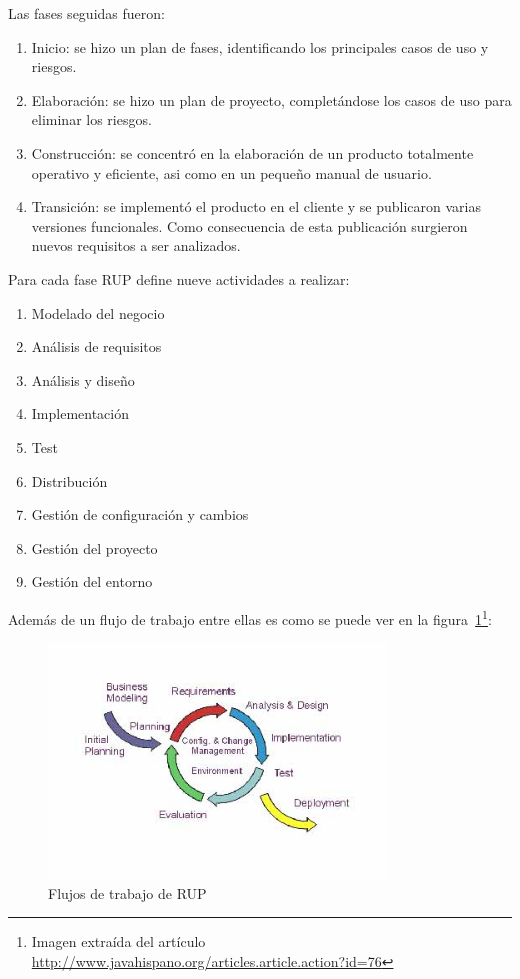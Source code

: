 Las fases seguidas fueron:

\begin{enumerate}
  \item Inicio: se hizo un plan de fases, identificando los principales 
	casos de uso y riesgos.
  \item Elaboración: se hizo un plan de proyecto, completándose los casos 
	de uso para eliminar los riesgos.
  \item Construcción: se concentró en la elaboración de un producto totalmente 
	operativo y eficiente, asi como en un pequeño manual de usuario.
  \item Transición: se implementó el producto en el cliente y se publicaron
	varias versiones funcionales. Como consecuencia de esta publicación
	surgieron nuevos requisitos a ser analizados.
\end{enumerate}

Para cada fase RUP define nueve actividades a realizar:

\begin{enumerate}
 \item Modelado del negocio
 \item Análisis de requisitos
 \item Análisis y diseño
 \item Implementación
 \item Test
 \item Distribución
 \item Gestión de configuración y cambios
 \item Gestión del proyecto
 \item Gestión del entorno
\end{enumerate}

Además de un flujo de trabajo entre ellas es como se puede ver en la 
figura~\ref{fig:RUPWorkflow}\footnote{Imagen extraída del artículo
\url{http://www.javahispano.org/articles.article.action?id=76}}:

\begin{figure}[ht]
	\centering
	\includegraphics[width=9cm]{images/workflow-rup.png}
	\caption{Flujos de trabajo de RUP}
	\label{fig:RUPWorkflow}
\end{figure}

